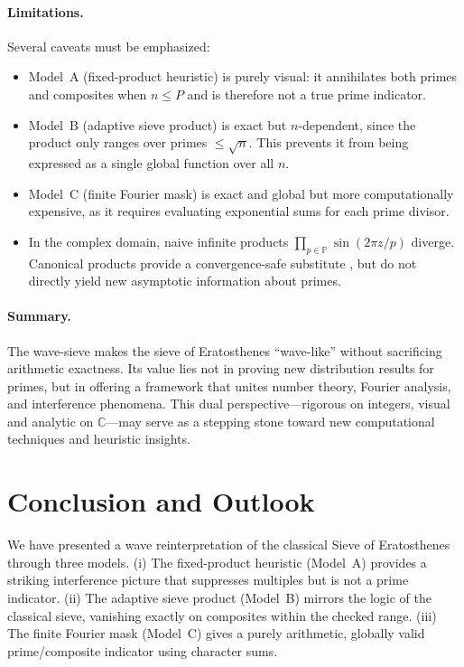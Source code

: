 \documentclass[12pt]{article}
\theoremstyle{definition}
\theoremstyle{remark}
\newcommand{\C}{\mathbb{C}}
\newcommand{\Primes}{\mathbb{P}}
\begin{document}
\paragraph{Limitations.}  
Several caveats must be emphasized:
\begin{itemize}
  \item Model~A (fixed-product heuristic) is purely visual: it annihilates both primes and composites when $n\le P$ and is therefore not a true prime indicator.
  \item Model~B (adaptive sieve product) is exact but $n$-dependent, since the product only ranges over primes $\le \sqrt{n}$. This prevents it from being expressed as a single global function over all $n$.
  \item Model~C (finite Fourier mask) is exact and global but more computationally expensive, as it requires evaluating exponential sums for each prime divisor.
  \item In the complex domain, naive infinite products $\prod_{p\in \Primes} \sin(2\pi z/p)$ diverge. Canonical products provide a convergence-safe substitute \citep{conway1995functions}, but do not directly yield new asymptotic information about primes.
\end{itemize}

\paragraph{Summary.}  
The wave-sieve makes the sieve of Eratosthenes “wave-like” without sacrificing arithmetic exactness. Its value lies not in proving new distribution results for primes, but in offering a framework that unites number theory, Fourier analysis, and interference phenomena. This dual perspective—rigorous on integers, visual and analytic on $\C$—may serve as a stepping stone toward new computational techniques and heuristic insights.

\section{Conclusion and Outlook}

We have presented a wave reinterpretation of the classical Sieve of Eratosthenes through three models.  
(i) The fixed-product heuristic (Model~A) provides a striking interference picture that suppresses multiples but is not a prime indicator.  
(ii) The adaptive sieve product (Model~B) mirrors the logic of the classical sieve, vanishing exactly on composites within the checked range.  
(iii) The finite Fourier mask (Model~C) gives a purely arithmetic, globally valid prime/composite indicator using character sums.  
\end{document}
